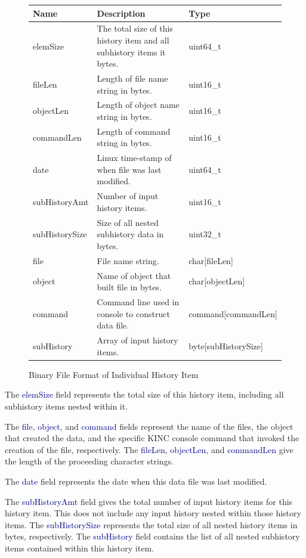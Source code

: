 \documentclass[10pt]{article}
\providecommand{\h}[1]{\textcolor{darkblue}{#1}}
\begin{document}
\begin{figure}[H]
\begin{mdframed}[style=btable]
\begin{tabularx}{\textwidth}{|l|X|l|}
\hline
\textbf{Name} & \textbf{Description} & \textbf{Type} \\
\hline
elemSize & The total size of this history item and all subhistory items it 
bytes. & uint64\_t \\
\hline
fileLen & Length of file name string in bytes. & uint16\_t \\
\hline
objectLen & Length of object name string in bytes. & uint16\_t \\
\hline
commandLen & Length of command string in bytes. & uint16\_t \\
\hline
date & Linux time-stamp of when file was last modified. & uint64\_t \\
\hline
subHistoryAmt & Number of input history items. & uint16\_t \\
\hline
subHistorySize & Size of all nested subhistory data in bytes. & uint32\_t \\
\hline
file & File name string. & char[fileLen] \\
\hline
object & Name of object that built file in bytes. & char[objectLen] \\
\hline
command & Command line used in console to construct data file. & 
command[commandLen] \\
\hline
subHistory & Array of input history items. & byte[subHistorySize] \\
\hline
\end{tabularx}
\end{mdframed}
\caption{Binary File Format of Individual History Item}
\label{fig:kincdata:history}
\end{figure}

The \h{elemSize} field represents the total size of this history item, 
including all subhistory items nested within it.

The \h{file}, \h{object}, and \h{command} fields represent the name of the 
files, the object that created the data, and the specific KINC console command 
that invoked the creation of the file, respectively. The \h{fileLen}, 
\h{objectLen}, and \h{commandLen} give the length of the proceeding character 
strings.

The \h{date} field represents the date when this data file was last modified.

The \h{subHistoryAmt} field gives the total number of input history items for 
this history item. This does not include any input history nested within those 
history items. The \h{subHistorySize} represents the total size of all nested 
history items in bytes, respectively. The \h{subHistory} field contains the 
list of all nested subhistory items contained within this history item.
\end{document}
